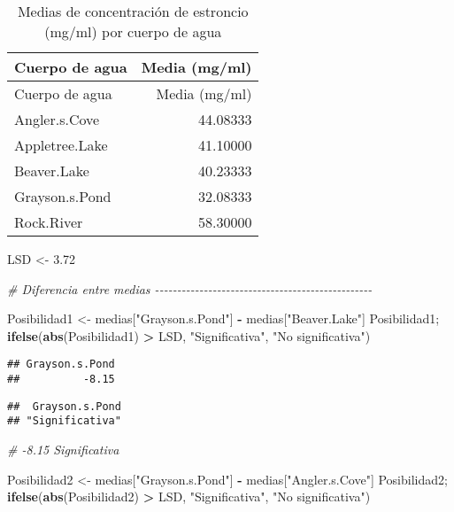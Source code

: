 \documentclass[
]{article}
\newenvironment{Shaded}{\begin{snugshade}}{\end{snugshade}}
\newcommand{\CommentTok}[1]{\textcolor[rgb]{0.56,0.35,0.01}{\textit{#1}}}
\newcommand{\FloatTok}[1]{\textcolor[rgb]{0.00,0.00,0.81}{#1}}
\newcommand{\FunctionTok}[1]{\textcolor[rgb]{0.13,0.29,0.53}{\textbf{#1}}}
\newcommand{\NormalTok}[1]{#1}
\newcommand{\OtherTok}[1]{\textcolor[rgb]{0.56,0.35,0.01}{#1}}
\newcommand{\SpecialCharTok}[1]{\textcolor[rgb]{0.81,0.36,0.00}{\textbf{#1}}}
\newcommand{\StringTok}[1]{\textcolor[rgb]{0.31,0.60,0.02}{#1}}
\begin{document}
\begin{longtable}[]{@{}lr@{}}
\caption{Medias de concentración de estroncio (mg/ml) por cuerpo de
agua}\tabularnewline
\toprule\noalign{}
Cuerpo de agua & Media (mg/ml) \\
\midrule\noalign{}
\endfirsthead
\toprule\noalign{}
Cuerpo de agua & Media (mg/ml) \\
\midrule\noalign{}
\endhead
\bottomrule\noalign{}
\endlastfoot
Angler.s.Cove & 44.08333 \\
Appletree.Lake & 41.10000 \\
Beaver.Lake & 40.23333 \\
Grayson.s.Pond & 32.08333 \\
Rock.River & 58.30000 \\
\end{longtable}

\begin{Shaded}
\begin{Highlighting}[]
\NormalTok{LSD }\OtherTok{\textless{}{-}} \FloatTok{3.72}

\CommentTok{\# Diferencia entre medias {-}{-}{-}{-}{-}{-}{-}{-}{-}{-}{-}{-}{-}{-}{-}{-}{-}{-}{-}{-}{-}{-}{-}{-}{-}{-}{-}{-}{-}{-}{-}{-}{-}{-}{-}{-}{-}{-}{-}{-}{-}{-}{-}{-}{-}{-}{-}{-}{-}}

\NormalTok{Posibilidad1 }\OtherTok{\textless{}{-}}\NormalTok{ medias[}\StringTok{"Grayson.s.Pond"}\NormalTok{] }\SpecialCharTok{{-}}\NormalTok{ medias[}\StringTok{"Beaver.Lake"}\NormalTok{]}
\NormalTok{Posibilidad1; }\FunctionTok{ifelse}\NormalTok{(}\FunctionTok{abs}\NormalTok{(Posibilidad1) }\SpecialCharTok{\textgreater{}}\NormalTok{ LSD, }\StringTok{"Significativa"}\NormalTok{, }\StringTok{"No significativa"}\NormalTok{)}
\end{Highlighting}
\end{Shaded}

\begin{verbatim}
## Grayson.s.Pond 
##          -8.15
\end{verbatim}

\begin{verbatim}
##  Grayson.s.Pond 
## "Significativa"
\end{verbatim}

\begin{Shaded}
\begin{Highlighting}[]
\CommentTok{\# {-}8.15 Significativa}

\NormalTok{Posibilidad2 }\OtherTok{\textless{}{-}}\NormalTok{ medias[}\StringTok{"Grayson.s.Pond"}\NormalTok{] }\SpecialCharTok{{-}}\NormalTok{ medias[}\StringTok{"Angler.s.Cove"}\NormalTok{]}
\NormalTok{Posibilidad2; }\FunctionTok{ifelse}\NormalTok{(}\FunctionTok{abs}\NormalTok{(Posibilidad2) }\SpecialCharTok{\textgreater{}}\NormalTok{ LSD, }\StringTok{"Significativa"}\NormalTok{, }\StringTok{"No significativa"}\NormalTok{)}
\end{Highlighting}
\end{Shaded}
\end{document}
